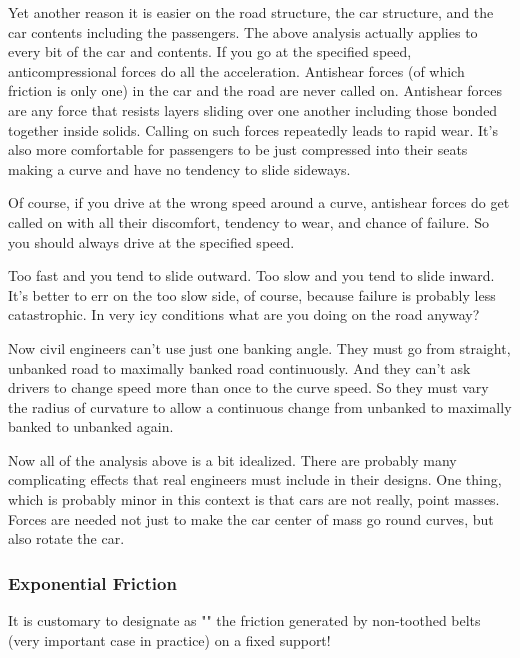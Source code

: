       Yet another reason it is easier on the road structure, the car structure, and the car contents including the passengers. The above analysis actually applies to every bit of the car and contents. If you go at the specified speed, anticompressional forces do all the acceleration. Antishear forces (of which friction is only one) in the car and the road  are never called on. Antishear forces are any force that resists layers sliding over one another including those bonded together inside solids. Calling on such forces repeatedly leads to rapid wear. It's also more comfortable for passengers to be just compressed into their seats making a curve and have no tendency to slide sideways. 

      Of course, if you drive at the wrong speed around a curve, antishear forces do get called on with all their discomfort, tendency to wear, and chance of failure. So you should always drive at the specified speed.

      Too fast and you tend to slide outward. Too slow and you tend to slide inward. It's better to err on the too slow side, of course, because failure is probably less catastrophic. In very icy conditions what are you doing on the road anyway?

      Now civil engineers can't use just one banking angle. They must go from straight, unbanked road to maximally banked road continuously.
And they can't ask drivers to change speed more than once to the
curve speed.  So they must vary the radius of curvature to allow a continuous change from unbanked to maximally banked to unbanked again.

      Now all of the analysis above is a bit idealized. There are probably many complicating effects that real engineers must include
in their designs. One thing, which is probably minor in this context is that cars are not really, point masses. Forces are needed not just to make the car center of mass go round curves, but also rotate the car.
	
	\pagebreak
	\subsubsection{Exponential Friction}
	It is customary to designate as "" the friction generated by non-toothed belts (very important case in practice) on a fixed support!

